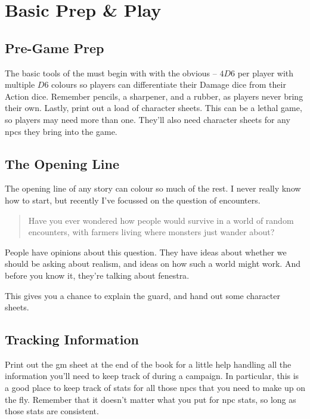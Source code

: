 \section{Basic Prep \& Play}

\begin{multicols}{2}

\subsection{Pre-Game Prep}

The basic tools of the  must begin with with the obvious -- $4D6$ per player with multiple $D6$ colours so players can differentiate their Damage dice from their Action dice.
Remember pencils, a sharpener, and a rubber, as players never bring their own.
Lastly, print out a load of character sheets.
This can be a lethal game, so players may need more than one.
They'll also need character sheets for any \glspl{npc} they bring into the game.

\subsection{The Opening Line}

The opening line of any story can colour so much of the rest.
I never really know how to start, but recently I've focussed on the question of encounters.

\begin{quotation}
  Have you ever wondered how people would survive in a world of random encounters, with farmers living where monsters just wander about?
\end{quotation}

People have opinions about this question.
They have ideas about whether we should be asking about realism, and ideas on how such a world might work.
And before you know it, they're talking about \gls{fenestra}.

This gives you a chance to explain the \gls{guard}, and hand out some character sheets.

\subsection{Tracking Information}

Print out the \gls{gm} sheet at the end of the book for a little help handling all the information you'll need to keep track of during a campaign.
In particular, this is a good place to keep track of stats for all those \glspl{npc} that you need to make up on the fly.
Remember that it doesn't matter what you put for \gls{npc} stats, so long as those stats are consistent.


\end{multicols}
